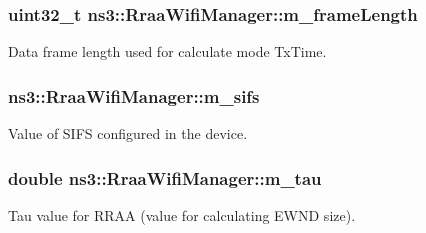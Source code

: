 \subsubsection[{\texorpdfstring{m\+\_\+frame\+Length}{m_frameLength}}]{\setlength{\rightskip}{0pt plus 5cm}uint32\+\_\+t ns3\+::\+Rraa\+Wifi\+Manager\+::m\+\_\+frame\+Length\hspace{0.3cm}{\ttfamily [private]}}\hypertarget{classns3_1_1RraaWifiManager_a43b8fc3fb7d677b03aaaf6803149b99e}{}\label{classns3_1_1RraaWifiManager_a43b8fc3fb7d677b03aaaf6803149b99e}


Data frame length used for calculate mode Tx\+Time. 

\subsubsection[{\texorpdfstring{m\+\_\+sifs}{m_sifs}}]{ ns3\+::\+Rraa\+Wifi\+Manager\+::m\+\_\+sifs\hspace{0.3cm}{\ttfamily [private]}}\hypertarget{classns3_1_1RraaWifiManager_ae7fe056435d03395ea3a010ce57a27c7}{}\label{classns3_1_1RraaWifiManager_ae7fe056435d03395ea3a010ce57a27c7}


Value of S\+I\+FS configured in the device. 

\subsubsection[{\texorpdfstring{m\+\_\+tau}{m_tau}}]{\setlength{\rightskip}{0pt plus 5cm}double ns3\+::\+Rraa\+Wifi\+Manager\+::m\+\_\+tau\hspace{0.3cm}{\ttfamily [private]}}\hypertarget{classns3_1_1RraaWifiManager_a0d9f0026dd2c7454fa346795bb1e0ea0}{}\label{classns3_1_1RraaWifiManager_a0d9f0026dd2c7454fa346795bb1e0ea0}


Tau value for R\+R\+AA (value for calculating E\+W\+ND size). 

